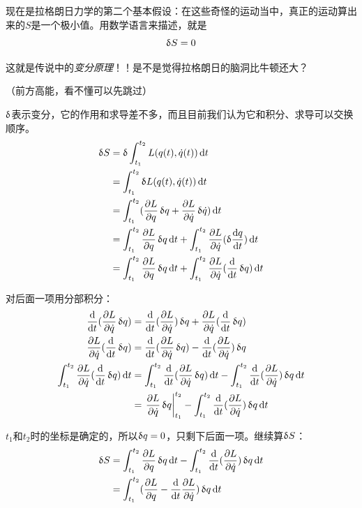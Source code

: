 现在是拉格朗日力学的第二个基本假设：在这些奇怪的运动当中，真正的运动算出来的$S$是一个极小值。用数学语言来描述，就是
\begin{equation*}
\mathop{}\!\updelta S=0
\end{equation*}

这就是传说中的\emph{变分原理}！！是不是觉得拉格朗日的脑洞比牛顿还大？

（前方高能，看不懂可以先跳过）

$\mathop{}\!\updelta$表示变分，它的作用和求导差不多，而且目前我们认为它和积分、求导可以交换顺序。
\begin{align*}
\opvar S&=\opvar \int_{t_1}^{t_2} L(q(t),\dot q(t)) \opd t \\
&=\int_{t_1}^{t_2} \opvar L(q(t),\dot q(t)) \opd t \\
&=\int_{t_1}^{t_2}(\frac{\partial L}{\partial q} \opvar q+\frac{\partial L}{\partial \dot q} \opvar \dot q)\opd t \\
&=\int_{t_1}^{t_2}\frac{\partial L}{\partial q} \opvar q \opd t+\int_{t_1}^{t_2}\frac{\partial L}{\partial \dot q} (\opvar \frac{\opd q}{\opd t}) \opd t \\
&=\int_{t_1}^{t_2}\frac{\partial L}{\partial q} \opvar q \opd t+\int_{t_1}^{t_2}\frac{\partial L}{\partial \dot q} (\opdt \opvar q) \opd t
\end{align*}

对后面一项用分部积分：
\begin{align*}
\opdt(\frac{\partial L}{\partial \dot q} \opvar q)&=\opdt(\frac{\partial L}{\partial \dot q}) \opvar q+\frac{\partial L}{\partial \dot q} (\opdt \opvar q) \\
\frac{\partial L}{\partial \dot q} (\opdt \opvar q)&=\opdt(\frac{\partial L}{\partial \dot q} \opvar q)-\opdt(\frac{\partial L}{\partial \dot q}) \opvar q \\
\int_{t_1}^{t_2}\frac{\partial L}{\partial \dot q} (\opdt \opvar q) \opd t&=\int_{t_1}^{t_2} \opdt(\frac{\partial L}{\partial \dot q} \opvar q) \opd t-\int_{t_1}^{t_2}\opdt(\frac{\partial L}{\partial \dot q}) \opvar q \opd t\\
&=\left. \frac{\partial L}{\partial \dot q} \opvar q \right|_{t_1}^{t_2}-\int_{t_1}^{t_2}\opdt(\frac{\partial L}{\partial \dot q}) \opvar q \opd t
\end{align*}

$t_1$和$t_2$时的坐标是确定的，所以$\mathop{}\!\updelta q=0$，只剩下后面一项。继续算$\mathop{}\!\updelta S$：
\begin{align*}
\opvar S&=\int_{t_1}^{t_2}\frac{\partial L}{\partial q} \opvar q \opd t-\int_{t_1}^{t_2}\opdt(\frac{\partial L}{\partial \dot q}) \opvar q \opd t \\
&=\int_{t_1}^{t_2}(\frac{\partial L}{\partial q}-\opdt\frac{\partial L}{\partial \dot q}) \opvar q \opd t
\end{align*}

